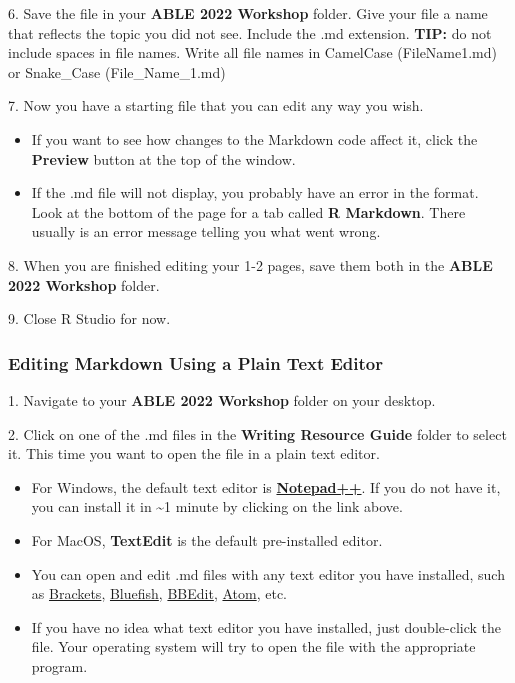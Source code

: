 \documentclass[
]{article}
\providecommand{\tightlist}{%
  \setlength{\itemsep}{0pt}\setlength{\parskip}{0pt}}
\begin{document}
6. Save the file in your \textbf{ABLE 2022 Workshop} folder. Give your
file a name that reflects the topic you did not see. Include the .md
extension. \textbf{TIP:} do not include spaces in file names. Write all
file names in CamelCase (FileName1.md) or Snake\_Case (File\_Name\_1.md)

7. Now you have a starting file that you can edit any way you wish.

\begin{itemize}
\tightlist
\item
  If you want to see how changes to the Markdown code affect it, click
  the \textbf{Preview} button at the top of the window.
\item
  If the .md file will not display, you probably have an error in the
  format. Look at the bottom of the page for a tab called \textbf{R
  Markdown}. There usually is an error message telling you what went
  wrong.
\end{itemize}

8. When you are finished editing your 1-2 pages, save them both in the
\textbf{ABLE 2022 Workshop} folder.

9. Close R Studio for now.

\hypertarget{editing-markdown-using-a-plain-text-editor}{%
\subsubsection{Editing Markdown Using a Plain Text
Editor}\label{editing-markdown-using-a-plain-text-editor}}

1. Navigate to your \textbf{ABLE 2022 Workshop} folder on your desktop.

2. Click on one of the .md files in the \textbf{Writing Resource Guide}
folder to select it. This time you want to open the file in a plain text
editor.

\begin{itemize}
\tightlist
\item
  For Windows, the default text editor is
  \href{https://notepad-plus-plus.org/}{\textbf{Notepad++}}. If you do
  not have it, you can install it in \textasciitilde1 minute by clicking
  on the link above.
\item
  For MacOS, \textbf{TextEdit} is the default pre-installed editor.
\item
  You can open and edit .md files with any text editor you have
  installed, such as \href{https://brackets.io/}{Brackets},
  \href{https://bluefish.openoffice.nl/index.html}{Bluefish},
  \href{https://www.barebones.com/products/bbedit/}{BBEdit},
  \href{https://atom.io/}{Atom}, etc.
\item
  If you have no idea what text editor you have installed, just
  double-click the file. Your operating system will try to open the file
  with the appropriate program.
\end{itemize}
\end{document}
